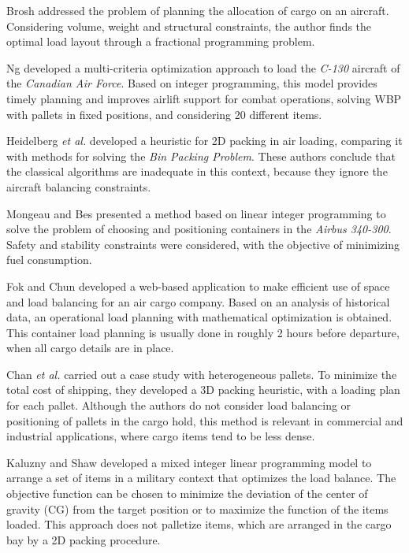 \documentclass[preprint]{elsarticle}
\begin{document}
Brosh \cite{Brosh1981} addressed the problem of planning the allocation of cargo on an aircraft. Considering volume, weight and structural constraints, the author finds the optimal load layout through a fractional programming problem.

Ng \cite{Kevin1992} developed a multi-criteria optimization approach to load the {\it C-130} aircraft of the {\it Canadian Air Force}. Based on integer programming, this model provides timely planning and improves airlift support for combat operations, solving WBP with pallets in fixed positions, and considering 20 different items.

Heidelberg {\it et al.} \cite{Heidelberg1998} developed a heuristic for 2D packing in air loading, comparing it with methods for solving the {\it Bin Packing Problem}. These authors conclude that the classical algorithms are inadequate in this context, because they ignore the aircraft balancing constraints.

Mongeau and Bes \cite{MongeauBes2003} presented a method based on linear integer programming to solve the problem of choosing and positioning containers in the {\it Airbus 340-300}. Safety and stability constraints were considered, with the objective of minimizing fuel consumption.

Fok and Chun \cite{fok2004optimizing} developed a web-based application to make efficient use of space and load balancing for an air cargo company. Based on an analysis of historical data, an operational load planning with mathematical optimization is obtained. This container load planning is usually done in roughly 2 hours before departure, when all cargo details are in place.

Chan {\it et al.} \cite{Chan2006} carried out a case study with heterogeneous pallets. To minimize the total cost of shipping, they developed a 3D packing heuristic, with a loading plan for each pallet. Although the authors do not consider load balancing or positioning of pallets in the cargo hold, this method is relevant in commercial and industrial applications, where cargo items tend to be less dense.

Kaluzny and Shaw \cite{KaluznyBohdanL2009Oalb} developed a mixed integer linear programming model to arrange a set of items in a military context that optimizes the load balance. The objective function can be chosen to minimize the deviation of the center of gravity (CG) from the target position or to maximize the function of the items loaded. This approach does not palletize items, which are arranged in the cargo bay by a 2D packing procedure.
\end{document}
